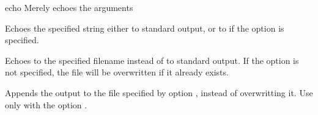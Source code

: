 \begin{nusmvCommand}{echo} {Merely echoes the arguments}


Echoes the specified string either to standard output, or to
 if the option  is specified.
\begin{cmdOpt}
 { Echoes to the specified
filename instead of to standard output. If the option 
is not specified, the file  will be overwritten 
if it already exists. }

 {Appends the output to the file specified by option
, instead of overwritting it. Use only with the option 
.}
\end{cmdOpt}
\end{nusmvCommand}
